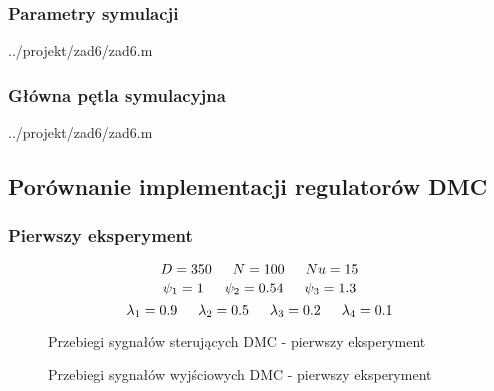 \subsubsection{Parametry symulacji}

\ifdefined\CompileListings
    
        {../projekt/zad6/zad6.m}
    \newpage
\fi

\subsubsection{Główna pętla symulacyjna}

\ifdefined\CompileListings
    
        {../projekt/zad6/zad6.m}
\fi
\newpage

\subsection{Porównanie implementacji regulatorów DMC}

\subsubsection{Pierwszy eksperyment}
$$D=350 \indent  N=100 \indent  Nu=15$$ 
$$\psi_1=\num{1} \indent \psi_2=\num{0.54} \indent \psi_3=\num{1.3}$$
$$\lambda_1=\num{0.9} \indent \lambda_2=\num{0.5} \indent \lambda_3=\num{0.2} \indent \lambda_4=\num{0.1}$$



\ifdefined\CompileFigures
    \begin{figure}[H] 
            \centering
            
            \caption{Przebiegi sygnałów sterujących DMC - pierwszy eksperyment}
            \label{projekt:zad6:figure:projzadanie6DMC1u}
    \end{figure}
\fi


\ifdefined\CompileFigures
    \begin{figure}[H] 
            \centering
            
            \caption{Przebiegi sygnałów wyjściowych DMC - pierwszy eksperyment}
            \label{projekt:zad6:figure:projzadanie6DMC1y}
    \end{figure}
\fi

